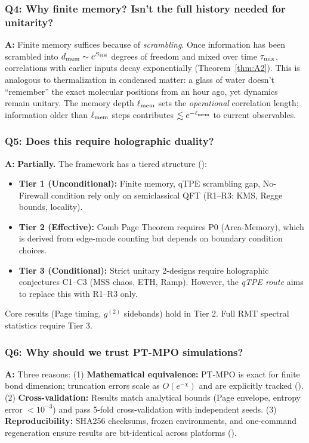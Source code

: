 \documentclass[11pt,a4paper]{article}
\theoremstyle{plain}
\theoremstyle{definition}
\theoremstyle{remark}
\begin{document}
\subsubsection{Q4: Why finite memory? Isn't the full history needed for unitarity?}
\textbf{A:} Finite memory suffices because of \emph{scrambling}. Once information has been scrambled into $d_{\rm mem} \sim e^{S_{\rm BH}}$ degrees of freedom and mixed over time $\tau_{\rm mix}$, correlations with earlier inputs decay exponentially (Theorem~\ref{thm:A2}). This is analogous to thermalization in condensed matter: a glass of water doesn't ``remember'' the exact molecular positions from an hour ago, yet dynamics remain unitary. The memory depth $\ell_{\rm mem}$ sets the \emph{operational} correlation length; information older than $\ell_{\rm mem}$ steps contributes $\lesssim e^{-\ell_{\rm mem}}$ to current observables.

\subsubsection{Q5: Does this require holographic duality?}
\textbf{A:} \textbf{Partially.} The framework has a tiered structure ():
\begin{itemize}[leftmargin=1.5em,itemsep=0.1em]
    \item \textbf{Tier 1 (Unconditional):} Finite memory, qTPE scrambling gap, No-Firewall condition rely only on semiclassical QFT (R1--R3: KMS, Regge bounds, locality).
    \item \textbf{Tier 2 (Effective):} Comb Page Theorem requires P0 (Area-Memory), which is derived from edge-mode counting but depends on boundary condition choices.
    \item \textbf{Tier 3 (Conditional):} Strict unitary 2-designs require holographic conjectures C1--C3 (MSS chaos, ETH, Ramp). However, the \emph{qTPE route} aims to replace this with R1--R3 only.
\end{itemize}
Core results (Page timing, $g^{(2)}$ sidebands) hold in Tier 2. Full RMT spectral statistics require Tier 3.

\subsubsection{Q6: Why should we trust PT-MPO simulations?}
\textbf{A:} Three reasons: (1) \textbf{Mathematical equivalence:} PT-MPO is exact for finite bond dimension; truncation errors scale as $O(e^{-\chi})$ and are explicitly tracked (). (2) \textbf{Cross-validation:} Results match analytical bounds (Page envelope, entropy error $<10^{-3}$) and pass 5-fold cross-validation with independent seeds. (3) \textbf{Reproducibility:} SHA256 checksums, frozen environments, and one-command regeneration ensure results are bit-identical across platforms ().
\end{document}
